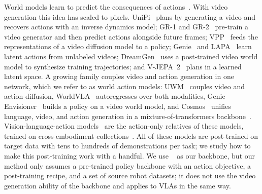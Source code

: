 World models learn to predict the consequences of actions~\cite{ha2018worldmodels,hafner2020dreamer}.
With video generation this idea has scaled to pixels.
UniPi~\cite{du2023unipi} plans by generating a video and recovers actions with an inverse dynamics model; GR-1 and GR-2~\cite{wu2024gr1,cheang2024gr2} pre-train a video generator and then predict actions alongside future frames; VPP~\cite{hu2025vpp} feeds the representations of a video diffusion model to a policy; Genie~\cite{bruce2024genie} and LAPA~\cite{ye2025lapa} learn latent actions from unlabeled videos; DreamGen~\cite{jang2025dreamgen} uses a post-trained video world model to synthesize training trajectories; and V-JEPA~2~\cite{assran2025vjepa2} plans in a learned latent space.
A growing family couples video and action generation in one network, which we refer to as world action models: UWM~\cite{zhu2025uwm} couples video and action diffusion, WorldVLA~\cite{cen2025worldvla} autoregresses over both modalities, Genie Envisioner~\cite{liao2025genieenvisioner} builds a policy on a video world model, and Cosmos~\cite{cosmos1,cosmos3} unifies language, video, and action generation in a mixture-of-transformers backbone~\cite{liang2024mot,zhou2024transfusion}.
Vision-language-action models~\cite{brohan2023rt1,zitkovich2023rt2,kim2024openvla,black2024pi0,octo2024,nvidia2025groot} are the action-only relatives of these models, trained on cross-embodiment collections~\cite{oneill2024oxe,khazatsky2024droid}.
All of these models are post-trained on target data with tens to hundreds of demonstrations per task; we study how to make this post-training work with a handful.
We use \base~\cite{cosmos3} as our backbone, but our method only assumes a pre-trained policy backbone with an action objective, a post-training recipe, and a set of source robot datasets; it does not use the video generation ability of the backbone and applies to VLAs in the same way.
